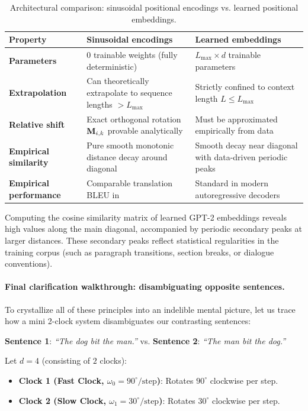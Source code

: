 \documentclass[../../main.tex]{subfiles}
\begin{document}
\begin{table}[htbp]
\centering
\small
\caption{Architectural comparison: sinusoidal positional encodings vs. learned positional embeddings.}
\label{tab:pe_comparison}
\begin{tabularx}{\textwidth}{lXX}
\toprule
\textbf{Property} & \textbf{Sinusoidal encodings \cite{vaswani2017}} & \textbf{Learned embeddings \cite{radford2019}} \\
\midrule
\textbf{Parameters} & $0$ trainable weights (fully deterministic) & $L_{\max} \times d$ trainable parameters \\
\textbf{Extrapolation} & Can theoretically extrapolate to sequence lengths $> L_{\max}$ & Strictly confined to context length $L \le L_{\max}$ \\
\textbf{Relative shift} & Exact orthogonal rotation $\mathbf{M}_{i, k}$ provable analytically & Must be approximated empirically from data \\
\textbf{Empirical similarity} & Pure smooth monotonic distance decay around diagonal & Smooth decay near diagonal with data-driven periodic peaks \\
\textbf{Empirical performance} & Comparable translation BLEU in \cite{vaswani2017} & Standard in modern autoregressive decoders \\
\bottomrule
\end{tabularx}
\end{table}

Computing the cosine similarity matrix of learned GPT-2 embeddings reveals high values along the main diagonal, accompanied by periodic secondary peaks at larger distances. These secondary peaks reflect statistical regularities in the training corpus (such as paragraph transitions, section breaks, or dialogue conventions).

\paragraph{Final clarification walkthrough: disambiguating opposite sentences.}
To crystallize all of these principles into an indelible mental picture, let us trace how a mini 2-clock system disambiguates our contrasting sentences:
\begin{center}
\textbf{Sentence 1}: \textit{``The dog bit the man.''} \quad vs. \quad \textbf{Sentence 2}: \textit{``The man bit the dog.''}
\end{center}
Let $d = 4$ (consisting of $2$ clocks):
\begin{itemize}
    \item \textbf{Clock 1 (Fast Clock, $\omega_0 = 90^\circ/\text{step}$)}: Rotates $90^\circ$ clockwise per step.
    \item \textbf{Clock 2 (Slow Clock, $\omega_1 = 30^\circ/\text{step}$)}: Rotates $30^\circ$ clockwise per step.
\end{itemize}
\end{document}

